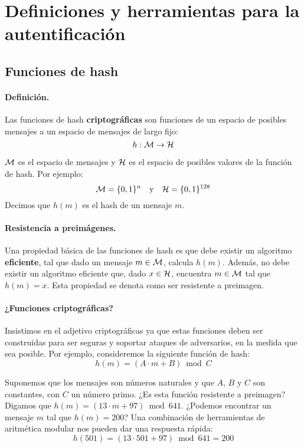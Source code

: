\section[Autentificación]{Definiciones y herramientas para la autentificación}

\subsection{Funciones de hash}

\paragraph{Definición.} Las funciones de hash \textbf{criptográficas} son funciones de un espacio de posibles mensajes a un espacio de mensajes de largo fijo:
$$
    h: \mathcal{M} \to \mathcal{H}
$$

$\mathcal{M}$ es el espacio de mensajes y $\mathcal{H}$ es el espacio de posibles valores de la función de hash. Por ejemplo:
$$
    \mathcal{M} = \{0,1\}^n \quad \text{y} \quad \mathcal{H} = \{0,1\}^{128}
$$
Decimos que $h(m)$ es el hash de un mensaje $m$. \medbreak

\paragraph{Resistencia a preimágenes.} Una propiedad básica de las funciones de hash es que debe existir un algoritmo \textbf{eficiente}, tal que dado un mensaje $m \in \mathcal{M}$, calcula $h(m)$. Además, no debe existir un algoritmo eficiente que, dado $x \in \mathcal{H}$, encuentra $m \in \mathcal{M}$ tal que $h(m) = x$. Esta propiedad se denota como ser resistente a preimagen.

\paragraph{¿Funciones criptográficas?} Insistimos en el adjetivo criptográficas ya que estas funciones deben ser construidas para ser seguras y soportar ataques de adversarios, en la medida que sea posible. Por ejemplo, consideremos la siguiente función de hash:
$$
    h(m) = (A \cdot m + B) \bmod C
$$

Suponemos que los mensajes son números naturales y que $A$, $B$ y $C$ son constantes, con $C$ un número primo. ¿Es esta función resistente a preimagen? Digamos que $h(m) = (13 \cdot m + 97) \bmod 641$. ¿Podemos encontrar un mensaje $m$ tal que $h(m) = 200$? Una combinación de herramientas de aritmética modular nos pueden dar una respuesta rápida:
$$
    h(501) = (13 \cdot 501 + 97) \bmod 641 = 200
$$

